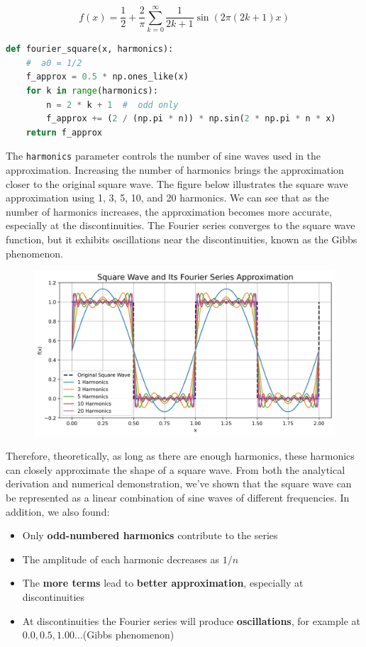 \documentclass[12pt, a4paper, oneside]{ctexart}
\begin{document}
\[f(x) = \frac{1}{2} + \frac{2}{\pi}\sum_{k=0}^{\infty} \frac{1}{2k+1}\sin(2\pi(2k+1)x)\]

\begin{lstlisting}[style=mystyle,language=Python]
	def fourier_square(x, harmonics):
    #  a0 = 1/2
    f_approx = 0.5 * np.ones_like(x)
    for k in range(harmonics):
        n = 2 * k + 1  #  odd only
        f_approx += (2 / (np.pi * n)) * np.sin(2 * np.pi * n * x)
    return f_approx
\end{lstlisting}

The \texttt{harmonics} parameter controls the number of sine waves used in the approximation. Increasing the number of harmonics brings the approximation closer to the original square wave. The figure below illustrates the square wave approximation using 1, 3, 5, 10, and 20 harmonics. We can see that as the number of harmonics increases, the approximation becomes more accurate, especially at the discontinuities. The Fourier series converges to the square wave function, but it exhibits oscillations near the discontinuities, known as the Gibbs phenomenon.

\begin{figure}[ht]
	\centering
	\includegraphics[width=1\textwidth]{result/square_wave_fourier.png}
\end{figure}



Therefore, theoretically, as long as there are enough harmonics, these harmonics can closely approximate the shape of a square wave. From both the analytical derivation and numerical demonstration, we've shown that the square wave can be represented as a linear combination of sine waves of different frequencies. In addition, we also found:
\begin{itemize}[itemsep=-3pt, parsep=0pt]
	\item Only \textbf{odd-numbered harmonics} contribute to the series
	\item The amplitude of each harmonic decreases as $1/n$
	\item The \textbf{more terms} lead to \textbf{better approximation}, especially at discontinuities
	\item At discontinuities the Fourier series will produce \textbf{oscillations}, for example at $0.0, 0.5, 1.00 \dots$(Gibbs phenomenon) 
\end{itemize}
\end{document}
